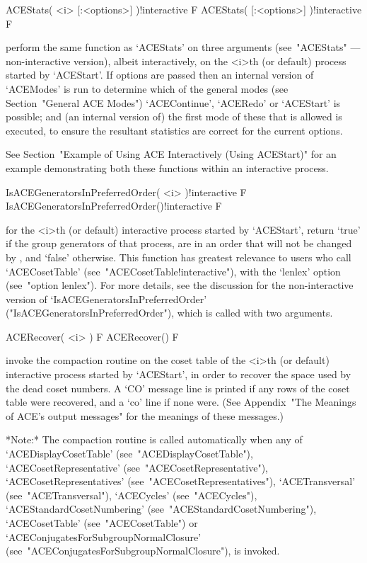 \>ACEStats( <i> [:<options>] )!{interactive} F
\>ACEStats( [:<options>] )!{interactive} F

perform  the  same  function  as   `ACEStats'   on   three   arguments
(see~"ACEStats" --- non-interactive version), albeit interactively, on
the <i>th (or default) process started by `ACEStart'. If  options  are
passed then an internal version of  `ACEModes'  is  run  to  determine
which of the general {\ACE} modes (see  Section~"General  ACE  Modes")
`ACEContinue', `ACERedo' or `ACEStart' is possible; and  (an  internal
version of) the first mode of these that is allowed  is  executed,  to
ensure the resultant statistics are correct for the current options.

See Section~"Example of Using ACE Interactively (Using ACEStart)"  for
an example demonstrating both these functions  within  an  interactive
process.

\>IsACEGeneratorsInPreferredOrder( <i> )!{interactive} F
\>IsACEGeneratorsInPreferredOrder()!{interactive} F

for the <i>th (or  default)  interactive  {\ACE}  process  started  by
`ACEStart', return `true' if the group generators of that process, are
in an order that will not be changed by {\ACE}, and `false' otherwise.
This function has greatest relevance to users who call `ACECosetTable'
(see~"ACECosetTable!interactive"),   with    the    `lenlex'    option
(see~"option lenlex"). For more details, see the  discussion  for  the
non-interactive    version    of     `IsACEGeneratorsInPreferredOrder'
("IsACEGeneratorsInPreferredOrder"),  which   is   called   with   two
arguments.


\>ACERecover( <i> ) F
\>ACERecover() F

invoke the compaction routine on the coset  table  of  the  <i>th  (or
default) interactive {\ACE} process started by `ACEStart', in order to
recover the space used by the dead coset numbers. A `CO' message  line
is printed if any rows of the coset table were recovered, and  a  `co'
line if  none  were.  (See  Appendix~"The  Meanings  of  ACE's  output
messages" for the meanings of these messages.)

*Note:*
The  compaction  routine  is  called   automatically   when   any   of
`ACEDisplayCosetTable'                   (see~"ACEDisplayCosetTable"),
`ACECosetRepresentative'               (see~"ACECosetRepresentative"),
`ACECosetRepresentatives'             (see~"ACECosetRepresentatives"),
`ACETransversal'          (see~"ACETransversal"),          `ACECycles'
(see~"ACECycles"),                         `ACEStandardCosetNumbering'
(see~"ACEStandardCosetNumbering"),                     `ACECosetTable'
(see~"ACECosetTable")    or    `ACEConjugatesForSubgroupNormalClosure'
(see~"ACEConjugatesForSubgroupNormalClosure"), is invoked.

